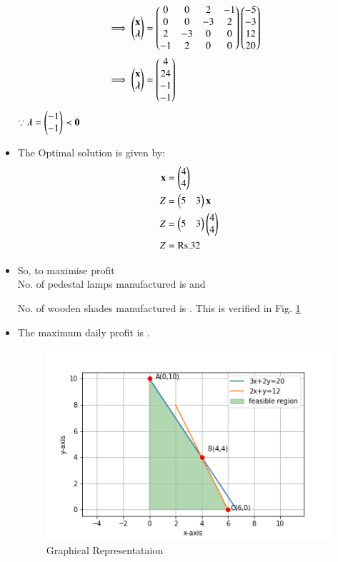 \begin{itemize}
\begin{align}
    \\
    \implies   \begin{pmatrix}\mathbf{x} \\ \boldsymbol{\lambda}\end{pmatrix} &= \begin{pmatrix}0 & 0 & 2 & -1 \\ 0 & 0 & -3 & 2 \\ 2 & -3 & 0 & 0 \\ -1 & 2 & 0 & 0\end{pmatrix}\begin{pmatrix}-5 \\ -3 \\ 12 \\ 20\end{pmatrix}
    \\
    \implies \begin{pmatrix}\mathbf{x} \\ \boldsymbol{\lambda}\end{pmatrix} &= \begin{pmatrix}4\\24 \\ -1 \\ -1 \end{pmatrix}
\end{align}
$\because \boldsymbol{\lambda}=\begin{pmatrix}-1 \\ -1\end{pmatrix} \prec \mathbf{0}$
\\
\item The Optimal solution is given by:
\begin{align}
    \mathbf{x} &= \begin{pmatrix}4\\4\end{pmatrix} \\
    Z &= \begin{pmatrix}5&3\end{pmatrix}\mathbf{x} \\
   Z &= \begin{pmatrix}5&3\end{pmatrix}\begin{pmatrix}4 \\ 4\end{pmatrix} \\
    Z&= \text{Rs.} 32
\end{align}
\item So, to maximise profit
\\
 No. of pedestal lamps manufactured is  and
 
 No. of wooden shades manufactured is .  This is verified in Fig. \ref{opt/fig/17}
\item The maximum daily profit is  .
%
\begin{figure}[!ht]
\centering
\includegraphics[width=\columnwidth]{solutions/su2021/2/17/assignment11.png}
\caption{Graphical Representataion}
\label{opt/fig/17}
\end{figure}
\end{itemize}

